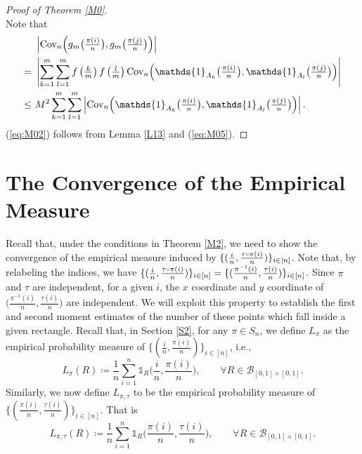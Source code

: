 \begin{proof}[Proof of Theorem \ref{M0}]
\begin{equation}
\end{equation}
Note that
\begin{align*}
& \textstyle \left|\cov_n\Big(g_m\big(\frac{\pi(i)}{n}\big), g_m\big(\frac{\pi(j)}{n}\big)\Big)\right| \\
=\ & \left|\sum_{k = 1}^m \sum_{l = 1}^m \textstyle f\left(\frac{k}{m}\right)f\left(\frac{l}{m}\right) \cov_n\Big(\mathds{1}_{A_k}\big(\frac{\pi(i)}{n}\big), \mathds{1}_{A_l}\big(\frac{\pi(j)}{n}\big)\Big)\right|\\
\le\ & M^2 \sum_{k = 1}^m \sum_{l = 1}^m \textstyle \left| \cov_n\Big(\mathds{1}_{A_k}\big(\frac{\pi(i)}{n}\big), \mathds{1}_{A_l}\big(\frac{\pi(j)}{n}\big)\Big)\right|.
\end{align*}
(\ref{eq:M02}) follows from Lemma \ref{L13} and (\ref{eq:M05}).
\end{proof}







\section{The Convergence of the Empirical Measure}
Recall that, under the conditions in Theorem \ref{M2}, we need to show the convergence of the empirical measure induced by $\{(\frac{i}{n}, \frac{\tau\ccirc\pi(i)}{n})\}_{i \in [n]}$.
Note that, by relabeling the indices, we have $\{(\frac{i}{n}, \frac{\tau\ccirc\pi(i)}{n})\}_{i \in [n]} = \{(\frac{\pi^{-1}(i)}{n}, \frac{\tau(i)}{n})\}_{i \in [n]}$.  Since $\pi$ and $\tau$ are independent, for a given $i$, the $x$ coordinate and $y$ coordinate of $\big(\frac{\pi^{-1}(i)}{n}, \frac{\tau(i)}{n}\big)$ are independent. We will exploit this property to establish the first and second moment estimates of the number of these points which fall inside a given rectangle. Recall that, in Section \ref{S2}, for any $\pi \in S_n$, we define $L_{\pi}$ as the empirical probability measure of $\{(\frac{i}{n}, \frac{\pi(i)}{n})\}_{i \in [n]}$, i.e.,
\[
L_{\pi}(R) \coloneqq \frac{1}{n}\sum_{i = 1}^{n} \mathds{1}_R\Big( \frac{i}{n}, \frac{\pi(i)}{n} \Big), \qquad \forall R \in  \mathcal{B}_{[0, 1]\times[0,1]}.
\]
Similarly, we now define $L_{\pi, \tau}$ to be the empirical probability measure of $\{(\frac{\pi(i)}{n}, \frac{\tau(i)}{n})\}_{i \in [n]}$. That is
\[
L_{\pi, \tau}(R) \coloneqq \frac{1}{n}\sum_{i = 1}^{n} \mathds{1}_R\Big(\frac{\pi(i)}{n}, \frac{\tau(i)}{n}\Big), \qquad \forall R \in  \mathcal{B}_{[0, 1]\times[0,1]}.
\]


